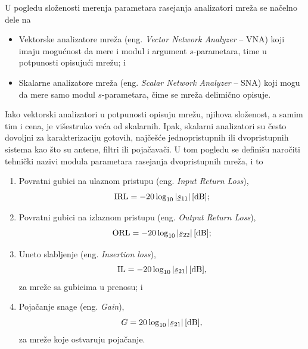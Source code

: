 \documentclass[a4paper, 12pt, diplomski]{etf}
\newcommand{\unit}[1]{\,{\rm #1}}
\newcommand{\faz}[1]{\underaccent{\bar}{#1}}
\begin{document}
U pogledu složenosti merenja parametara rasejanja 
analizatori mreža se načelno dele na 
\begin{itemize}
    \item Vektorske analizatore mreža 
    (eng. \textit{Vector Network Analyzer} -- VNA) koji
    imaju mogućnost 
    da mere i modul i argument $s$-parametara,
    time u potpunosti opisujući mrežu; i
    \item Skalarne analizatore mreža
    (eng. \textit{Scalar Network Analyzer} --
    SNA) koji mogu da mere samo 
    modul $s$-parametara, čime se mreža 
    delimično opisuje.
\end{itemize}
Iako vektorski analizatori u potpunosti
opisuju mrežu, njihova složenost, a samim tim i cena, je višestruko
veća od skalarnih. Ipak, skalarni 
analizatori su često dovoljni za karakterizaciju
gotovih, najčešće jednopristupnih ili dvopristupnih sistema
kao što su antene, filtri ili pojačavači. U tom pogledu se
definišu naročiti tehnički nazivi modula parametara 
rasejanja dvopristupnih mreža, i to
\begin{enumerate}
    \item Povratni gubici na ulaznom 
    pristupu (eng. \textit{Input Return Loss}), 
    $${\rm IRL} = - 20 \log_{10}|\faz s_{11}|\unit{[dB]};$$ 
    \item Povratni gubici na izlaznom 
    pristupu (eng. \textit{Output Return Loss}), 
    $${\rm ORL} = - 20 \log_{10}|\faz s_{22}|\unit{[dB]};$$
    \item Uneto slabljenje (eng. \textit{Insertion loss}), 
    $${\rm IL} = - 20 \log_{10}|\faz s_{21}|\unit{[dB]},$$ za mreže sa gubicima u 
    prenosu; i
    \item Pojačanje snage (eng. \textit{Gain}), 
    $$G = 20 \log_{10}|\faz s_{21}|\unit{[dB]},$$ za mreže koje ostvaruju pojačanje.
\end{enumerate}
\end{document}
